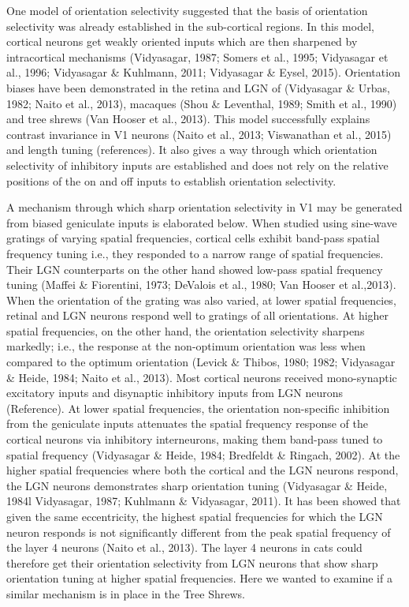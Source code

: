 One model of orientation selectivity suggested that the basis of orientation selectivity was already established in the sub-cortical regions. In this model, cortical neurons get weakly oriented inputs which are then sharpened by intracortical mechanisms (Vidyasagar, 1987; Somers et al., 1995; Vidyasagar et al., 1996; Vidyasagar \& Kuhlmann, 2011; Vidyasagar \& Eysel, 2015).  Orientation biases have been demonstrated in the retina and LGN of  (Vidyasagar \& Urbas, 1982; Naito et al., 2013), macaques (Shou \& Leventhal, 1989; Smith et al., 1990) and tree shrews (Van Hooser et al., 2013). This model successfully explains contrast invariance in V1 neurons (Naito et al., 2013; Viswanathan et al., 2015) and length tuning (references). It also gives a way through which orientation selectivity of inhibitory inputs are established and does not rely on the relative positions of the on and off inputs to establish orientation selectivity.

A mechanism through which sharp orientation selectivity in V1 may be generated from biased geniculate inputs is elaborated below. When studied using sine-wave gratings of varying spatial frequencies, cortical cells exhibit band-pass spatial frequency tuning i.e., they responded to a narrow range of spatial frequencies. Their LGN counterparts on the other hand showed low-pass spatial frequency tuning (Maffei \& Fiorentini, 1973; DeValois et al., 1980; Van Hooser et al.,2013). When the orientation of the grating was also varied, at lower spatial frequencies, retinal and LGN neurons respond well to gratings of all orientations. At higher spatial frequencies, on the other hand, the orientation selectivity sharpens markedly; i.e., the response at the non-optimum orientation was less when compared to the optimum orientation (Levick \& Thibos, 1980; 1982; Vidyasagar \& Heide, 1984; Naito et al., 2013). Most cortical neurons received mono-synaptic excitatory inputs and disynaptic inhibitory inputs from LGN neurons (Reference). At lower spatial frequencies, the orientation non-specific inhibition from the geniculate inputs attenuates the spatial frequency response of the cortical neurons via inhibitory interneurons, making them band-pass tuned to spatial frequency (Vidyasagar \& Heide, 1984; Bredfeldt \& Ringach, 2002). At the higher spatial frequencies where both the cortical and the LGN neurons respond, the LGN neurons demonstrates sharp orientation tuning (Vidyasagar \& Heide, 1984l Vidyasagar, 1987; Kuhlmann \& Vidyasagar, 2011). It has been showed that given the same eccentricity, the highest spatial frequencies for which the LGN neuron responds is not significantly different from the peak spatial frequency of the layer 4 neurons (Naito et al., 2013). The layer 4 neurons in cats could therefore get their orientation selectivity from LGN neurons that show sharp orientation tuning at higher spatial frequencies. Here we wanted to examine if a similar mechanism is in place in the Tree Shrews. 


